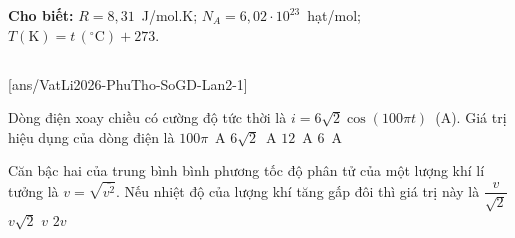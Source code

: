\def\CheDo{solcolor}%
\def\tenchuong{Sở GD\&ĐT Phú Thọ -- Lần 2}
\def\thuonghieu{VẬT LÍ 12 -- Eduzy.com.vn}
\def\TachCauDS{1}
\def\TachCauLG{1}




	\noindent\textbf{Cho biết:} $R=8{,}31$~J/mol.K; $N_A=6{,}02\cdot 10^{23}$~hạt/mol; $T(\text{K})=t\,(^\circ\text{C})+273$.

	\noindent
	\subsection*{}
	\setcounter{ex}{0}
	[ans/VatLi2026-PhuTho-SoGD-Lan2-1]

	\begin{ex}%
		Dòng điện xoay chiều có cường độ tức thời là $i=6\sqrt{2}\cos(100\pi t)$~(A). Giá trị hiệu dụng của dòng điện là
		\choice
		{$100\pi$~A}
		{$6\sqrt{2}$~A}
		{$12$~A}
		{\True $6$~A}
	\end{ex}

	\begin{ex}%
		Căn bậc hai của trung bình bình phương tốc độ phân tử của một lượng khí lí tưởng là $v=\sqrt{\overline{v^2}}$. Nếu nhiệt độ của lượng khí tăng gấp đôi thì giá trị này là
		\choice
		{$\dfrac{v}{\sqrt{2}}$}
		{\True $v\sqrt{2}$}
		{$v$}
		{$2v$}
	\end{ex}

